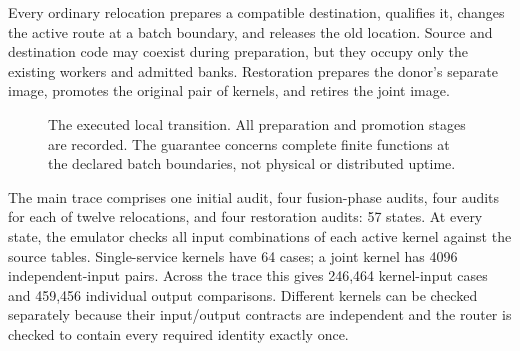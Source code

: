 \documentclass[11pt,letterpaper]{article}
\theoremstyle{definition}\newtheorem{definition}[theorem]{Definition}
\theoremstyle{remark}\newtheorem{remark}[theorem]{Remark}
\begin{document}
Every ordinary relocation prepares a compatible destination, qualifies it, changes the active route at a batch boundary, and releases the old location. Source and destination code may coexist during preparation, but they occupy only the existing workers and admitted banks. Restoration prepares the donor's separate image, promotes the original pair of kernels, and retires the joint image.

\begin{figure}[htbp]\centering
{}
\caption{The executed local transition. All preparation and promotion stages are recorded. The guarantee concerns complete finite functions at the declared batch boundaries, not physical or distributed uptime.}
\label{fig:trace}
\end{figure}

The main trace comprises one initial audit, four fusion-phase audits, four audits for each of twelve relocations, and four restoration audits: 57 states. At every state, the emulator checks all input combinations of each active kernel against the source tables. Single-service kernels have 64 cases; a joint kernel has 4096 independent-input pairs. Across the trace this gives 246,464 kernel-input cases and 459,456 individual output comparisons. Different kernels can be checked separately because their input/output contracts are independent and the router is checked to contain every required identity exactly once.
\end{document}
